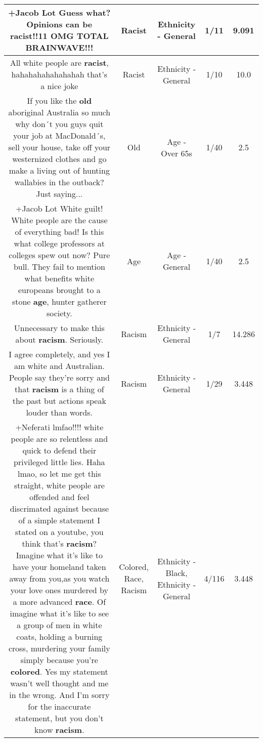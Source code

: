 \documentclass[11pt]{article}
\newlength\mylength
\begin{document}
\begin{center}
\begin{longtable}{|C{.65\mylength}|C{.30\mylength}|C{.12\mylength}|C{.12\mylength}|C{.12\mylength}|}
  \small +Jacob Lot Guess what? Opinions can be \textbf{racist}!!11 OMG TOTAL BRAINWAVE!!!\normalsize   & Racist & Ethnicity - General & 1/11 & 9.091 \\  \hline
  \small All white people are \textbf{racist}, hahahahahahahahah that's a nice joke\normalsize   & Racist & Ethnicity - General & 1/10 & 10.0 \\  \hline
  \small If you like the \textbf{old} aboriginal Australia so much why don´t you guys quit your job at MacDonald´s, sell your house, take off your westernized clothes and go make a living out of hunting wallabies in the outback? Just saying...\normalsize   & Old & Age - Over 65s & 1/40 & 2.5 \\  \hline
  \small +Jacob Lot White guilt! White people are the cause of everything bad! Is this what college professors at colleges spew out now? Pure bull.  They fail to mention what benefits white europeans brought to a stone \textbf{age}, hunter gatherer society.\normalsize   & Age & Age - General & 1/40 & 2.5 \\  \hline
  \small Unnecessary to make this about \textbf{racism}. Seriously.\normalsize   & Racism & Ethnicity - General & 1/7 & 14.286 \\  \hline
  \small I agree completely, and yes I am white and Australian. People say they're sorry and that \textbf{racism} is a thing of the past but actions speak louder than words.\normalsize   & Racism & Ethnicity - General & 1/29 & 3.448 \\  \hline
  \small +Neferati lmfao!!!! white people are so relentless and quick to defend their privileged little lies. Haha lmao, so let me get this straight, white people are offended and feel discrimated against because of a simple statement I stated on a youtube, you think that's \textbf{racism}?  Imagine what it's like to have your homeland taken away from you,as you watch your love ones murdered by a more advanced \textbf{race}. Of imagine what it's like to see a group of men in white coats, holding a burning cross, murdering your family simply because you're \textbf{colored}. Yes my statement wasn't well thought and me in the wrong. And I'm sorry for the inaccurate statement, but you don't know \textbf{racism}.\normalsize   & Colored, Race, Racism & Ethnicity - Black, Ethnicity - General & 4/116 & 3.448 \\  \hline

\end{longtable}
\end{center}
\end{document}
